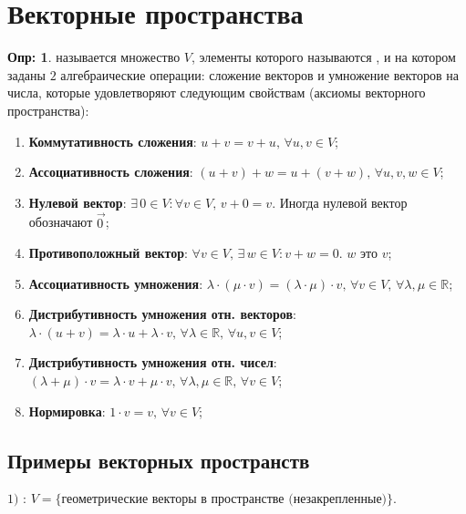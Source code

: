 \documentclass[12pt]{article}
\newcommand{\RN}[1]{%
	\textup{\uppercase\expandafter{\romannumeral#1}}%
}
\newcommand{\MR}{\mathbb{R}}
\theoremstyle{definition}
\newtheorem{defn}{Опр:}
\newcommand{\vecm}[1]{\overrightarrow{#1\,}}
\begin{document}
\lhead{Алгебра-\RN{1}}

\section*{Векторные пространства}
\begin{defn}
	 называется множество $V$, элементы которого называются , и на котором заданы $2$ алгебраические операции: сложение векторов и умножение векторов на числа, которые удовлетворяют следующим свойствам (аксиомы векторного пространства):
	\begin{enumerate}[label=\arabic*)]
		\item \textbf{Коммутативность сложения}: $u + v = v + u , \, \forall u,v \in V$;
		\item \textbf{Ассоциативность сложения}: $(u + v) + w = u + (v + w), \, \forall u,v,w \in V$;
		\item\textbf{Нулевой вектор}: $\exists \, 0 \in V \colon \forall v \in V, \, v + 0 = v$. Иногда нулевой вектор обозначают $\vecm{0}$;
		\item \textbf{Противоположный вектор}: $\forall v \in V, \, \exists \, w \in V \colon v + w = 0$. $w$ это  $v$;
		\item \textbf{Ассоциативность умножения}: $\lambda{\cdot}(\mu{\cdot}v) = (\lambda{\cdot}\mu){\cdot}v, \, \forall v \in V,\, \forall \lambda, \mu \in \MR$;
		\item \textbf{Дистрибутивность умножения отн. векторов}: $\lambda{\cdot}(u + v) = \lambda{\cdot}u + \lambda{\cdot}v, \, \forall \lambda \in \MR, \, \forall u,v \in V$; 
		\item \textbf{Дистрибутивность умножения отн. чисел}: $(\lambda + \mu){\cdot} v = \lambda{\cdot}v + \mu{\cdot}v, \, \forall \lambda, \mu \in \MR, \, \forall v \in V$;
		\item \textbf{Нормировка}: $1{\cdot} v = v, \, \forall v \in V$;
	\end{enumerate}
\end{defn}

\subsection*{Примеры векторных пространств}
$1)$ : $V = \{\text{геометрические векторы в пространстве (незакрепленные)}\}$.
\end{document}
